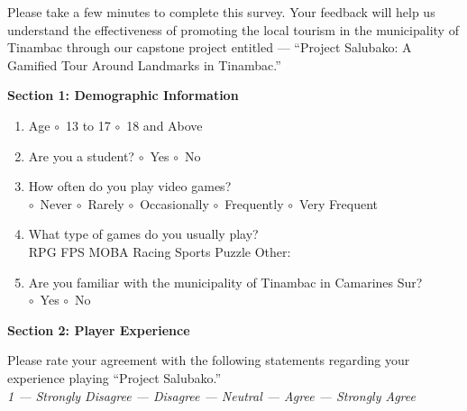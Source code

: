\documentclass{research}
\begin{document}
Please take a few minutes to complete this survey. Your feedback will help us understand
the effectiveness of promoting the local tourism in the municipality of Tinambac through
our capstone project entitled --- ``Project Salubako: A Gamified Tour Around Landmarks
in Tinambac.''

\textbf{Section 1: Demographic Information}

\begin{enumerate}
  \item Age \hspace{1em} $\circ$~13 to 17 \hspace{1em} $\circ$~18 and Above
  \item Are you a student? \hspace{1em} $\circ$~Yes \hspace{1em} $\circ$~No
  \item How often do you play video games?\\
        $\circ$~Never \hspace{0.5em} $\circ$~Rarely \hspace{0.5em}
        $\circ$~Occasionally \hspace{0.5em} $\circ$~Frequently \hspace{0.5em}
        $\circ$~Very Frequent
  \item What type of games do you usually play?\\
        RPG \hspace{0.5em} FPS \hspace{0.5em} MOBA \hspace{0.5em}
        Racing \hspace{0.5em} Sports \hspace{0.5em} Puzzle \hspace{0.5em}
        Other: \underline{\hspace{3cm}}
  \item Are you familiar with the municipality of Tinambac in Camarines Sur?\\
        $\circ$~Yes \hspace{1em} $\circ$~No
\end{enumerate}

\vspace{0.5em}
\textbf{Section 2: Player Experience}

\noindent Please rate your agreement with the following statements regarding your
experience playing ``Project Salubako.''\\
\textit{1 --- Strongly Disagree  --- Disagree  --- Neutral  --- Agree  --- Strongly Agree}
\end{document}

